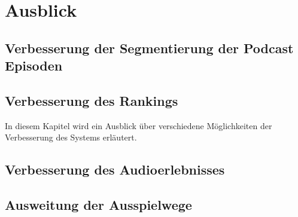 \chapter{Ausblick}\label{ch:outlook}

\section{Verbesserung der Segmentierung der Podcast Episoden}

\section{Verbesserung des Rankings}
In diesem Kapitel wird ein Ausblick über verschiedene Möglichkeiten der Verbesserung des Systems erläutert.

\section{Verbesserung des Audioerlebnisses}

\section{Ausweitung der Ausspielwege}